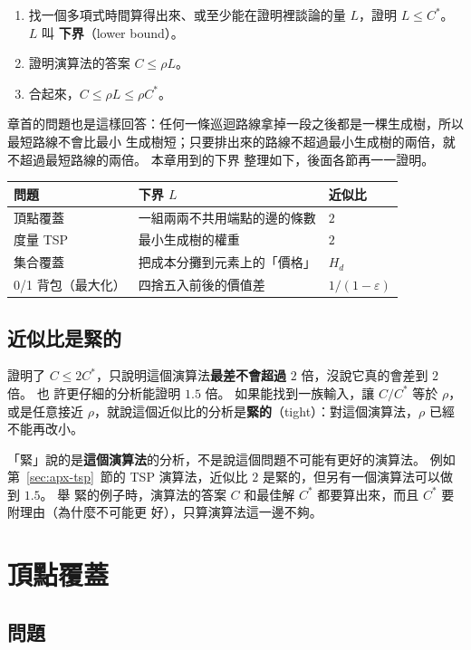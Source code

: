 \begin{enumerate}
\item 找一個多項式時間算得出來、或至少能在證明裡談論的量 $L$，證明 $L \le C^*$。 $L$ 叫
\textbf{下界}（lower bound）。
\item 證明演算法的答案 $C \le \rho L$。
\item 合起來，$C \le \rho L \le \rho C^*$。
\end{enumerate}

章首的問題也是這樣回答：任何一條巡迴路線拿掉一段之後都是一棵生成樹，所以最短路線不會比最小
生成樹短；只要排出來的路線不超過最小生成樹的兩倍，就不超過最短路線的兩倍。 本章用到的下界
整理如下，後面各節再一一證明。

\begin{center}
\begin{tabular}{lll}
\toprule
問題 & 下界 $L$ & 近似比 \\
\midrule
頂點覆蓋 & 一組兩兩不共用端點的邊的條數 & $2$ \\
度量 TSP & 最小生成樹的權重 & $2$ \\
集合覆蓋 & 把成本分攤到元素上的「價格」 & $H_d$ \\
0/1 背包（最大化） & 四捨五入前後的價值差 & $1/(1 - \varepsilon)$ \\
\bottomrule
\end{tabular}
\end{center}

\subsection{近似比是緊的}

證明了 $C \le 2C^*$，只說明這個演算法\textbf{最差不會超過} $2$ 倍，沒說它真的會差到 $2$ 倍。 也
許更仔細的分析能證明 $1.5$ 倍。 如果能找到一族輸入，讓 $C / C^*$ 等於 $\rho$，或是任意接近
$\rho$，就說這個近似比的分析是\textbf{緊的}（tight）：對這個演算法，$\rho$ 已經不能再改小。

「緊」說的是\textbf{這個演算法}的分析，不是說這個問題不可能有更好的演算法。 例如
第~\ref{sec:apx-tsp}~節的 TSP 演算法，近似比 $2$ 是緊的，但另有一個演算法可以做到 $1.5$。 舉
緊的例子時，演算法的答案 $C$ 和最佳解 $C^*$ 都要算出來，而且 $C^*$ 要附理由（為什麼不可能更
好），只算演算法這一邊不夠。

\section{頂點覆蓋}
\label{sec:apx-vc}

\subsection{問題}

